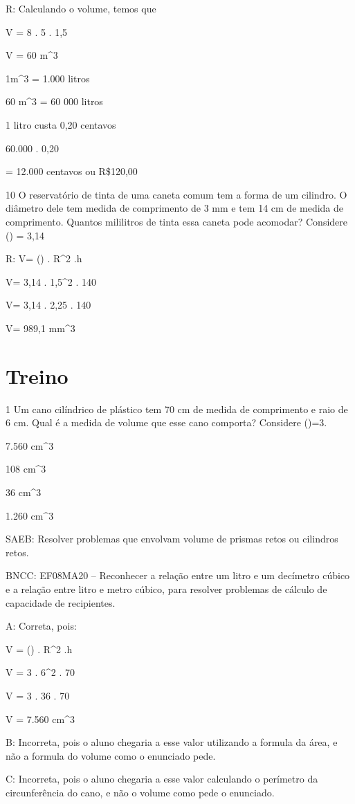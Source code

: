 {R: Calculando o volume, temos que

V = 8 . 5 . 1,5

V = 60 m^3

1m^3 = 1.000 litros

60 m^3 = 60 000 litros

1 litro custa 0,20 centavos

60.000 . 0,20

= 12.000 centavos ou R\$120,00

\num{10} O reservatório de tinta de uma caneta comum tem a forma de um
cilindro. O diâmetro dele tem medida de comprimento de 3 mm e tem 14 cm
de medida de comprimento. Quantos mililitros de tinta essa caneta pode
acomodar? Considere (\Pi) = 3,14

R: V= (\Pi) . R^2 .h

V= 3,14 . 1,5^2 . 140

V= 3,14 . 2,25 . 140

V= 989,1 mm^3

\section{Treino}

\num{1} Um cano cilíndrico de plástico tem 70 cm de medida de comprimento e
raio de 6 cm. Qual é a medida de volume que esse cano comporta?
Considere (\Pi)=3.
\item 7.560 cm^3
\item 108 cm^3
\item 36 cm^3
\item 1.260 cm^3

SAEB: Resolver problemas que envolvam volume de prismas retos ou
cilindros retos.

BNCC: EF08MA20 -- Reconhecer a relação entre um litro e um decímetro
cúbico e a relação entre litro e metro cúbico, para resolver problemas
de cálculo de capacidade de recipientes.

A: Correta, pois:

V = (\Pi) . R^2 .h

V = 3 . 6^2 . 70

V = 3 . 36 . 70

V = 7.560 cm^3

B: Incorreta, pois o aluno chegaria a esse valor utilizando a formula da
área, e não a formula do volume como o enunciado pede.

C: Incorreta, pois o aluno chegaria a esse valor calculando o perímetro
da circunferência do cano, e não o volume como pede o enunciado.

}
